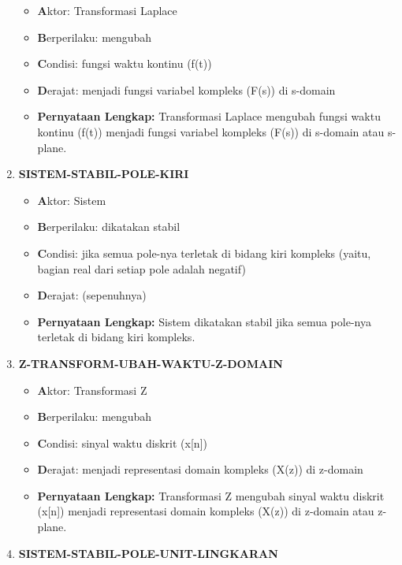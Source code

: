\documentclass[
  letterpaper,
  DIV=11,
  numbers=noendperiod]{scrreprt}
\begin{document}
\begin{enumerate}
  \begin{itemize}
  \item
    \textbf{A}ktor: Transformasi Laplace
  \item
    \textbf{B}erperilaku: mengubah
  \item
    \textbf{C}ondisi: fungsi waktu kontinu (f(t))
  \item
    \textbf{D}erajat: menjadi fungsi variabel kompleks (F(s)) di
    s-domain
  \item
    \textbf{Pernyataan Lengkap:} Transformasi Laplace mengubah fungsi
    waktu kontinu (f(t)) menjadi fungsi variabel kompleks (F(s)) di
    s-domain atau s-plane.
  \end{itemize}
\item
  \textbf{SISTEM-STABIL-POLE-KIRI}

  \begin{itemize}
  \item
    \textbf{A}ktor: Sistem
  \item
    \textbf{B}erperilaku: dikatakan stabil
  \item
    \textbf{C}ondisi: jika semua pole-nya terletak di bidang kiri
    kompleks (yaitu, bagian real dari setiap pole adalah negatif)
  \item
    \textbf{D}erajat: (sepenuhnya)
  \item
    \textbf{Pernyataan Lengkap:} Sistem dikatakan stabil jika semua
    pole-nya terletak di bidang kiri kompleks.
  \end{itemize}
\item
  \textbf{Z-TRANSFORM-UBAH-WAKTU-Z-DOMAIN}

  \begin{itemize}
  \item
    \textbf{A}ktor: Transformasi Z
  \item
    \textbf{B}erperilaku: mengubah
  \item
    \textbf{C}ondisi: sinyal waktu diskrit (x{[}n{]})
  \item
    \textbf{D}erajat: menjadi representasi domain kompleks (X(z)) di
    z-domain
  \item
    \textbf{Pernyataan Lengkap:} Transformasi Z mengubah sinyal waktu
    diskrit (x{[}n{]}) menjadi representasi domain kompleks (X(z)) di
    z-domain atau z-plane.
  \end{itemize}
\item
  \textbf{SISTEM-STABIL-POLE-UNIT-LINGKARAN}


\end{enumerate}
\end{document}
